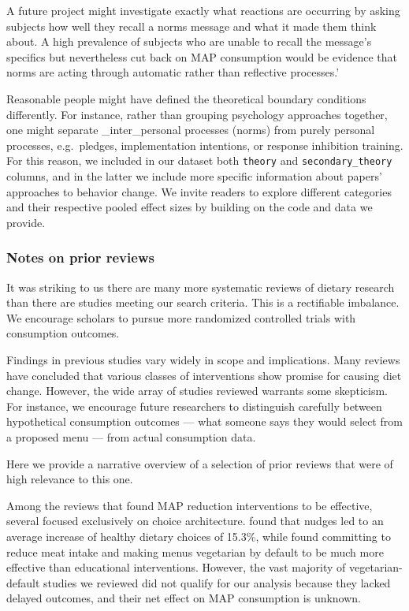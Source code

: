 \documentclass[sn-nature,referee,pdflatex]{sn-jnl}
\begin{document}
A future project might investigate exactly what reactions are occurring
by asking subjects how well they recall a norms message and what it made
them think about. A high prevalence of subjects who are unable to recall
the message's specifics but nevertheless cut back on MAP consumption
would be evidence that norms are acting through automatic rather than
reflective processes.'

Reasonable people might have defined the theoretical boundary conditions
differently. For instance, rather than grouping psychology approaches
together, one might separate \_inter\_personal processes (norms) from
purely personal processes, e.g.~pledges, implementation intentions, or
response inhibition training. For this reason, we included in our
dataset both \texttt{theory} and \texttt{secondary\_theory} columns, and
in the latter we include more specific information about papers'
approaches to behavior change. We invite readers to explore different
categories and their respective pooled effect sizes by building on the
code and data we provide.

\subsubsection{Notes on prior reviews}\label{notes-on-prior-reviews}

It was striking to us there are many more systematic reviews of dietary
research than there are studies meeting our search criteria. This is a
rectifiable imbalance. We encourage scholars to pursue more randomized
controlled trials with consumption outcomes.

Findings in previous studies vary widely in scope and implications. Many
reviews have concluded that various classes of interventions show
promise for causing diet change. However, the wide array of studies
reviewed warrants some skepticism. For instance, we encourage future
researchers to distinguish carefully between hypothetical consumption
outcomes --- what someone says they would select from a proposed menu
--- from actual consumption data.

Here we provide a narrative overview of a selection of prior reviews
that were of high relevance to this one.

Among the reviews that found MAP reduction interventions to be
effective, several focused exclusively on choice architecture.
\citep{arno2016} found that nudges led to an average increase of healthy
dietary choices of 15.3\%, while \citep{byerly2018} found committing to
reduce meat intake and making menus vegetarian by default to be much
more effective than educational interventions. However, the vast
majority of vegetarian-default studies we reviewed did not qualify for
our analysis because they lacked delayed outcomes, and their net effect
on MAP consumption is unknown.
\end{document}
